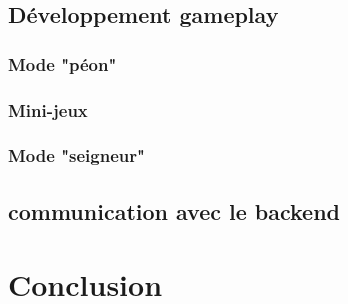 \documentclass[french,a4paper,10pt]{article}
\begin{document}
    \subsection{Développement gameplay}
        \subsubsection{Mode "péon"}
        \subsubsection{Mini-jeux}
        \subsubsection{Mode "seigneur"}
        
    \subsection{communication avec le backend}

\section{Conclusion}
\end{document}
